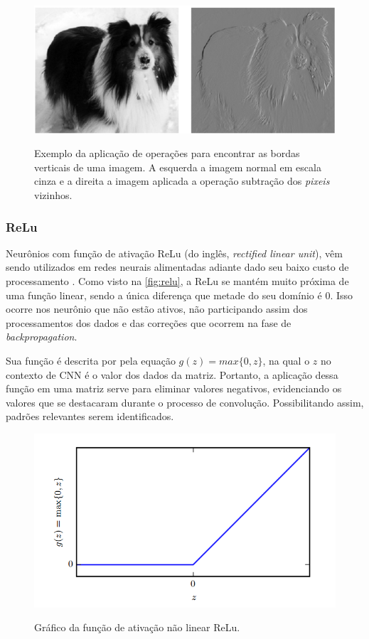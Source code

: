 \begin{figure}[H]
  \centering
  \caption{Exemplo da aplicação de operações para encontrar as bordas verticais de uma imagem. A esquerda a imagem normal em escala cinza e a direita a imagem aplicada a operação subtração dos \textit{pixeis} vizinhos.}
  \includegraphics[width=400pt]{dados/figuras/convolution}
  \label{fig:convolution}
\end{figure}


\subsubsection{ReLu}

Neurônios com função de ativação ReLu (do inglês, \textit{rectified linear unit}), vêm sendo utilizados em redes neurais alimentadas adiante dado seu baixo custo de processamento \cite{glorot2011deep}. Como visto na \autoref{fig:relu}, a ReLu se mantém muito próxima de uma função linear, sendo a única diferença que metade do seu domínio é 0. Isso ocorre nos neurônio que não estão ativos, não participando assim dos processamentos dos dados e das correções que ocorrem na fase de \textit{backpropagation}.
\par Sua função é descrita por pela equação $g(z)=max\{0,z\}$, na qual o $z$ no contexto de CNN é o valor dos dados da matriz. Portanto, a aplicação dessa função em uma matriz serve para eliminar valores negativos, evidenciando os valores que se destacaram durante o processo de convolução. Possibilitando assim, padrões relevantes serem identificados.
\begin{figure}[H]
  \centering
  \caption{Gráfico da função de ativação não linear ReLu.}
  \includegraphics[width=400pt]{dados/figuras/relu}
  \label{fig:relu}
\end{figure}

